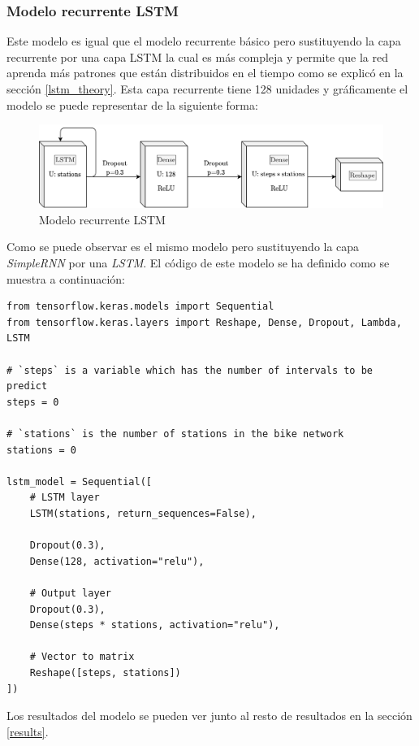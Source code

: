 \subsubsection{Modelo recurrente LSTM}

Este modelo es igual que el modelo recurrente básico pero sustituyendo la capa recurrente por una capa LSTM la cual es más compleja y permite que la red aprenda más patrones que están distribuidos en el tiempo como se explicó en la sección \ref{lstm_theory}. Esta capa recurrente tiene 128 unidades y gráficamente el modelo se puede representar de la siguiente forma:
\begin{figure}[H]
    \centering
    \includegraphics[width=12cm]{images/solution/models/LSTM.png}
    \caption{Modelo recurrente LSTM}
    \label{fig:dense-model}
\end{figure}

Como se puede observar es el mismo modelo pero sustituyendo la capa \textit{SimpleRNN} por una \textit{LSTM}. El código de este modelo se ha definido como se muestra a continuación:
\begin{verbatim}
from tensorflow.keras.models import Sequential
from tensorflow.keras.layers import Reshape, Dense, Dropout, Lambda, LSTM

# `steps` is a variable which has the number of intervals to be predict
steps = 0 

# `stations` is the number of stations in the bike network
stations = 0

lstm_model = Sequential([
    # LSTM layer
    LSTM(stations, return_sequences=False),
    
    Dropout(0.3),
    Dense(128, activation="relu"),
    
    # Output layer
    Dropout(0.3),
    Dense(steps * stations, activation="relu"),
    
    # Vector to matrix
    Reshape([steps, stations])
])
\end{verbatim}

Los resultados del modelo se pueden ver junto al resto de resultados en la sección \ref{results}.